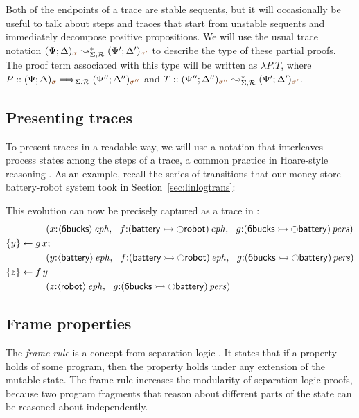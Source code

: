 Both of the endpoints of a trace are stable sequents, but it will
occasionally be useful to talk about steps and traces that start from
unstable sequents and immediately decompose positive propositions. We will use
the usual trace notation $(\Psi; \Delta)_{\lf\sigma}
\leadsto^*_{\Sigma,\subord} (\Psi'; \Delta')_{\lf{\sigma'}}$ to
describe the type of these partial proofs. The proof term
associated with this type will be written as $\lambda P.T$, where $P :: (\Psi;
\Delta)_{\lf\sigma} \Longrightarrow_{\Sigma,\subord} (\Psi'';
\Delta'')_{\lf{\sigma''}}$ and $T :: (\Psi'';
\Delta'')_{\lf{\sigma''}} \leadsto^*_{\Sigma,\subord} (\Psi';
\Delta')_{\lf{\sigma'}}$. 


\subsection{Presenting traces}
\label{sec:presentingtraces}

To present traces in a readable way, we will use a notation that
interleaves process states among the steps of a trace, a common
practice in Hoare-style reasoning \cite{hoare71proof}.  As an example,
recall the series of transitions that our money-store-battery-robot
system took in Section~\ref{sec:linlogtrans}: 
%

%
This evolution can now be precisely captured as a trace in \sls:
\begin{align*}
&\qquad\qquad
\left(
 x{:}{\langle {\sf 6bucks} \rangle}\,{{\it eph}}, ~~
 f{:}{({\sf battery} \rightarrowtail {\ocircle}{\sf robot})}\,{{\it eph}}, ~~
 g{:}{({\sf 6bucks} \rightarrowtail {\ocircle}{\sf battery})}\,{{\it pers}}
\right)
\\
&\{{y}\} \leftarrow {g\,x};
\\
&\qquad\qquad
\left(
 y{:}{\langle {\sf battery} \rangle}\,{{\it eph}}, ~~
 f{:}{({\sf battery} \rightarrowtail {\ocircle}{\sf robot})}\,{{\it eph}}, ~~
 g{:}{({\sf 6bucks} \rightarrowtail {\ocircle}{\sf battery})}\,{{\it pers}}
\right)
\\
&\{{z}\} \leftarrow {f\,y}
\\
&\qquad\qquad
\left(
 z{:}{\langle {\sf robot} \rangle}\,{{\it eph}}, ~~
 g{:}{({\sf 6bucks} \rightarrowtail {\ocircle}{\sf battery})}\,{{\it pers}}
\right)
\end{align*}

\subsection{Frame properties}

The {\it frame rule} is a concept from separation logic
\cite{reynolds02separation}.  It states that if a property holds of
some program, then the property holds under any extension of the
mutable state. The frame rule increases the modularity of separation
logic proofs, because two program fragments that reason about
different parts of the state can be reasoned about independently.

